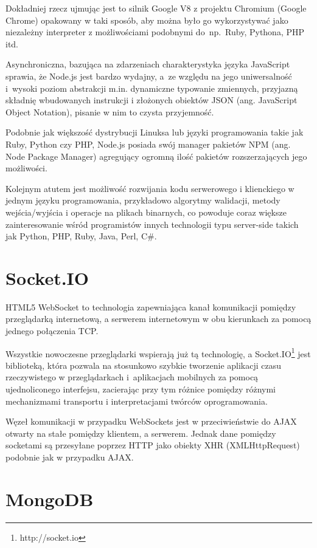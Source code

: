 \documentclass[twoside,a4paper,openright,12pt]{book}
\begin{document}
Dokładniej rzecz ujmując jest to silnik Google V8 z projektu Chromium (Google Chrome) opakowany w taki sposób, aby można było go wykorzystywać jako niezależny interpreter z możliwościami podobnymi do~np.~Ruby, Pythona, PHP itd.

Asynchroniczna, bazująca na zdarzeniach charakterystyka języka JavaScript sprawia, że Node.js jest bardzo wydajny, a~ze względu na jego uniwersalność i~wysoki poziom abstrakcji m.in. dynamiczne typowanie zmiennych, przyjazną składnię wbudowanych instrukcji i złożonych obiektów JSON (ang. JavaScript Object Notation), pisanie w nim to czysta przyjemność.

Podobnie jak większość dystrybucji Linuksa lub języki programowania takie jak Ruby, Python czy PHP, Node.js posiada swój manager pakietów NPM (ang. Node Package Manager) agregujący ogromną ilość pakietów rozszerzających jego możliwości.

Kolejnym atutem jest możliwość rozwijania kodu serwerowego i klienckiego w jednym języku programowania, przykładowo algorytmy walidacji, metody wejścia/wyjścia i operacje na plikach binarnych, co powoduje coraz większe zainteresowanie wśród programistów innych technologii typu server-side takich jak Python, PHP, Ruby, Java, Perl, C\#.


\section{Socket.IO}

HTML5 WebSocket to technologia zapewniająca kanał komunikacji pomiędzy przeglądarką internetową, a serwerem internetowym w obu kierunkach za pomocą jednego połączenia TCP.

Wszystkie nowoczesne przeglądarki wspierają już tą technologię, a Socket.IO\footnote{http://socket.io} jest biblioteką, która pozwala na stosunkowo szybkie tworzenie aplikacji czasu rzeczywistego w przeglądarkach i~aplikacjach mobilnych za pomocą ujednoliconego interfejsu, zacierając przy tym różnice pomiędzy różnymi mechanizmami transportu i interpretacjami twórców oprogramowania.

Węzeł komunikacji w przypadku WebSockets jest w przeciwieństwie do AJAX otwarty na stałe pomiędzy klientem, a serwerem. Jednak dane pomiędzy socketami są przesyłane poprzez HTTP jako obiekty XHR (XMLHttpRequest) podobnie jak w przypadku AJAX. \cite{croucher2012node}


\section{MongoDB}
\end{document}
